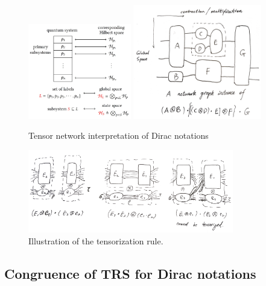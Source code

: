 \begin{figure}[h]
  \center
  \includegraphics*[width=0.4\textwidth]{fig/space_stack.jpg}
  \includegraphics*[width=0.5\textwidth]{fig/tn_example.png}
  \caption{Tensor network interpretation of Dirac notations}
\end{figure}

  
\begin{figure}[h]
  \center
  \includegraphics*[width=0.8\textwidth]{fig/rule_tn_example.png}
  \caption{Illustration of the tensorization rule.}
  \label{fig:tensorization_rule}  
\end{figure}


\subsection{Congruence of TRS for Dirac notations}

